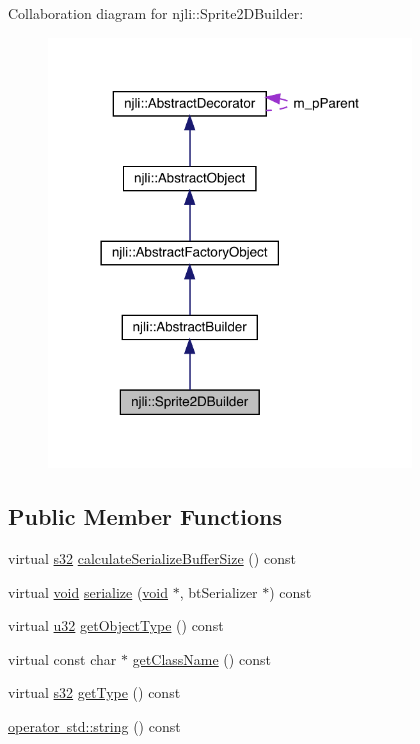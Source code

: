 Collaboration diagram for njli\+:\+:Sprite2\+D\+Builder\+:\nopagebreak
\begin{figure}[H]
\begin{center}
\leavevmode
\includegraphics[width=273pt]{classnjli_1_1_sprite2_d_builder__coll__graph}
\end{center}
\end{figure}
\subsection*{Public Member Functions}
\begin{DoxyCompactItemize}
\item 
virtual \mbox{\hyperlink{_util_8h_aa62c75d314a0d1f37f79c4b73b2292e2}{s32}} \mbox{\hyperlink{classnjli_1_1_sprite2_d_builder_ac26bca06d2e4c266c65f8f7255f7e5a3}{calculate\+Serialize\+Buffer\+Size}} () const
\item 
virtual \mbox{\hyperlink{_thread_8h_af1e856da2e658414cb2456cb6f7ebc66}{void}} \mbox{\hyperlink{classnjli_1_1_sprite2_d_builder_a22b346d352d04147e8341b16a012ae0b}{serialize}} (\mbox{\hyperlink{_thread_8h_af1e856da2e658414cb2456cb6f7ebc66}{void}} $\ast$, bt\+Serializer $\ast$) const
\item 
virtual \mbox{\hyperlink{_util_8h_a10e94b422ef0c20dcdec20d31a1f5049}{u32}} \mbox{\hyperlink{classnjli_1_1_sprite2_d_builder_a5d998e1a0923159ff1545adffcbe9a60}{get\+Object\+Type}} () const
\item 
virtual const char $\ast$ \mbox{\hyperlink{classnjli_1_1_sprite2_d_builder_ac8758df00e11e876e1181a325dd072f5}{get\+Class\+Name}} () const
\item 
virtual \mbox{\hyperlink{_util_8h_aa62c75d314a0d1f37f79c4b73b2292e2}{s32}} \mbox{\hyperlink{classnjli_1_1_sprite2_d_builder_a708d8ea5fa85721c46de45ca9a5f9c54}{get\+Type}} () const
\item 
\mbox{\hyperlink{classnjli_1_1_sprite2_d_builder_a61638422c15f960617b72a22dab99af5}{operator std\+::string}} () const
\end{DoxyCompactItemize}
